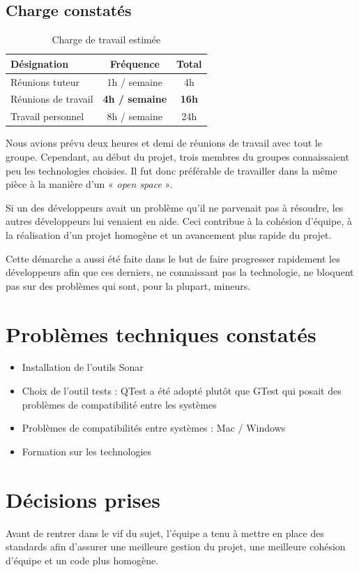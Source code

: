 \documentclass[12pt,a4paper,openany]{article}
\begin{document}
	\subsection{Charge constatés}
	\begin{table}[H]
		\centering
		\begin{tabular}{l|c|c}
			\textbf{Désignation} & \textbf{Fréquence} & \textbf{Total}\\
			\hline
			Réunions tuteur & 1h / semaine & 4h\\
			Réunions de travail & \textbf{4h / semaine} & \textbf{16h}\\
			Travail personnel & 8h / semaine & 24h
		\end{tabular}
		\caption{Charge de travail estimée}
	\end{table}
	Nous avions prévu deux heures et demi de réunions de travail avec tout le groupe. Cependant, au début du projet, trois membres du groupes
	connaissaient peu les technologies choisies. Il fut donc préférable de travailler dans la même pièce à la manière d’un « \textit{open space} ». 
	
	Si un des développeurs avait un problème qu'il ne parvenait pas à résoudre, les autres développeurs lui venaient en aide. Ceci contribue à la cohésion
	d'équipe, à la réalisation d’un projet homogène et un avancement plus rapide du projet. 
	
	Cette démarche a aussi été faite dans le but de faire
	progresser rapidement les développeurs afin que ces derniers, ne connaissant pas la technologie, ne bloquent pas sur des problèmes qui sont, pour
	la plupart, mineurs.

	\section{Problèmes techniques constatés}
	\begin{itemize}
		\item Installation de l'outils Sonar
		\item Choix de l'outil tests : QTest a été adopté plutôt que GTest qui posait des problèmes de compatibilité entre les systèmes 
		\item Problèmes de compatibilités entre systèmes : Mac / Windows
		\item Formation sur les technologies
	\end{itemize}
	\section{Décisions prises}
	Avant de rentrer dans le vif du sujet, l'équipe a tenu à mettre en place des standards afin d’assurer une meilleure gestion du projet, une
	meilleure cohésion d’équipe et un code plus homogène. 
\end{document}
